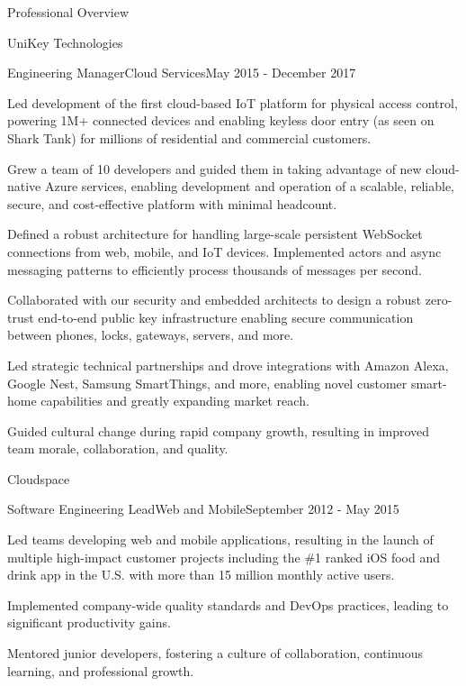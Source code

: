\documentclass{resume} %
\begin{document}
\begin{rSection}{Professional Overview}
\begin{rCompany}{UniKey Technologies}{}{}
    \begin{rSubSubsection}{Engineering Manager}{Cloud Services}{May 2015 - December 2017}
      \item Led development of the first cloud-based IoT platform for physical access control, powering 1M+ connected devices and enabling keyless door entry (as seen on Shark Tank) for millions of residential and commercial customers.
      \item Grew a team of 10 developers and guided them in taking advantage of new cloud-native Azure services, enabling development and operation of a scalable, reliable, secure, and cost-effective platform with minimal headcount.
      \item Defined a robust architecture for handling large-scale persistent WebSocket connections from web, mobile, and IoT devices. Implemented actors and async messaging patterns to efficiently process thousands of messages per second.
      \item Collaborated with our security and embedded architects to design a robust zero-trust end-to-end public key infrastructure enabling secure communication between phones, locks, gateways, servers, and more.
      \item Led strategic technical partnerships and drove integrations with Amazon Alexa, Google Nest, Samsung SmartThings, and more, enabling novel customer smart-home capabilities and greatly expanding market reach.
      \item Guided cultural change during rapid company growth, resulting in improved team morale, collaboration, and quality.
    \end{rSubSubsection}
  \end{rCompany}

  \begin{rCompany}{Cloudspace}{}{}

    \begin{rSubSubsection}{Software Engineering Lead}{Web and Mobile}{September 2012 - May 2015}
      \item Led teams developing web and mobile applications, resulting in the launch of multiple high-impact customer projects including the \#1 ranked iOS food and drink app in the U.S. with more than 15 million monthly active users.
      \item Implemented company-wide quality standards and DevOps practices, leading to significant productivity gains.
      \item Mentored junior developers, fostering a culture of collaboration, continuous learning, and professional growth.
    \end{rSubSubsection}
  \end{rCompany}


\end{rSection}
\end{document}
